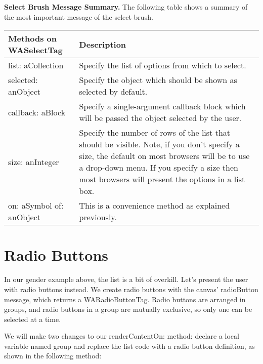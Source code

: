 \documentclass[a4paper,10pt,twoside]{book}
\newcommand{\ct}[1]{{\small\ttfamily\textup{#1}}}
\begin{document}

\textbf{Select Brush Message Summary.} The following table shows a summary of the most important message of the \ct{select} brush. 


\begin{tabularx}{\textwidth}{lX}
\textbf{Methods on \ct{WASelectTag} }&\textbf{Description}\\ \hline
 \index{WASelectTag!list: aCollection} \ct{list: aCollection} & Specify the list of options from which to select. \\
 \index{WASelectTag!selected: anObject} \ct{selected: anObject} & Specify the object which should be shown as selected by default. \\
 \index{WASelectTag!callback: aBlock} \ct{callback: aBlock} & Specify a single-argument callback block which will be passed the object selected by the user.\\
 \index{WASelectTag!size: anInteger} \ct{size: anInteger} & Specify the number of rows of the list that should be visible. Note, if you don't specify a size, the default on most browsers will be to use a drop-down menu. If you specify a size then most browsers will present the options in a list box. \\
 \index{WASelectTag!on: aSymbol of: anObject} \ct{on: aSymbol of: anObject}& This is a convenience method as explained previously. \\
\end{tabularx}

\section{Radio Buttons}
\label{book:fundamentals:forms:radiobuttons}


In our gender example above, the list is a bit of overkill. Let's present the user with radio buttons instead. We create radio buttons with the canvas'  \ct{radioButton} message, which returns a  \ct{WARadioButtonTag}. Radio buttons are arranged in groups, and radio buttons in a group are mutually exclusive, so only one can be selected at a time. 

We will make two changes to our \ct{renderContentOn:} method: declare a local variable named \ct{group} and replace the list code with a radio button definition, as shown in the following method:
\end{document}
